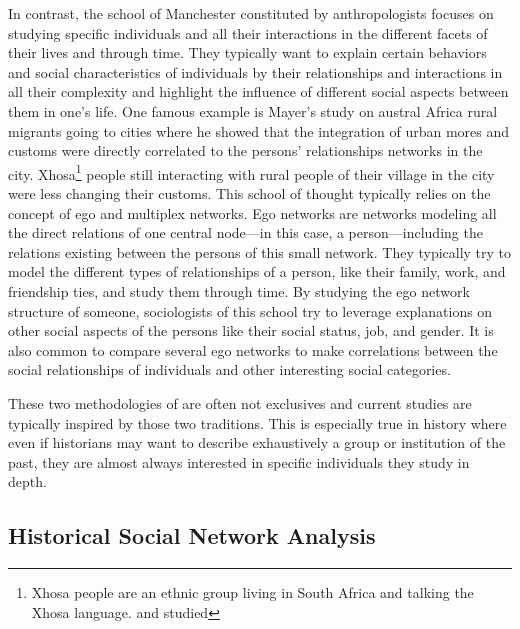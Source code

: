 In contrast, the school of Manchester constituted by anthropologists focuses on studying specific individuals and all their interactions in the different facets of their lives and through time.
They typically want to explain certain behaviors and social characteristics of individuals by their relationships and interactions in all their complexity and highlight the influence of different social aspects between them in one's life.
One famous example is Mayer's study on austral Africa rural migrants going to cities\cite{mayerMigrancyStudyAfricans1962} where he showed that the integration of urban mores and customs were directly correlated to the persons' relationships networks in the city.
Xhosa\footnote{Xhosa people are an ethnic group living in South Africa and talking the Xhosa language. and studied} people still interacting with rural people of their village in the city were less changing their customs.
This school of thought typically relies on the concept of ego and multiplex networks\cite{eveDeuxTraditionsAnalyse2002}.
Ego networks are networks modeling all the direct relations of one central node---in this case, a person---including the relations existing between the persons of this small network.
They typically try to model the different types of relationships of a person, like their family, work, and friendship ties, and study them through time.
By studying the ego network structure of someone, sociologists of this school try to leverage explanations on other social aspects of the persons like their social status, job, and gender.
It is also common to compare several ego networks to make correlations between the social relationships of individuals and other interesting social categories\cite{charbeyStarsHolesPaths2019}.

These two methodologies of \sna are often not exclusives and current studies are typically inspired by those two traditions.
This is especially true in history where even if historians may want to describe exhaustively a group or institution of the past, they are almost always interested in specific individuals they study in depth.



\subsection{Historical Social Network Analysis}\label{subsec:historical-social-network-analsyis}

